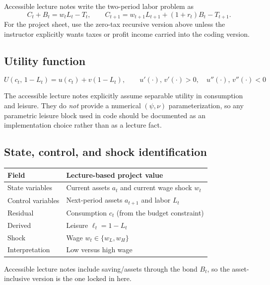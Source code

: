 \documentclass[11pt]{article}
\begin{document}
\begin{notebox}
Accessible lecture notes write the two-period labor problem as
\[
C_t + B_t = w_t L_t - T_t, \qquad C_{t+1} = w_{t+1}L_{t+1} + (1+r_t)B_t - T_{t+1}.
\]
For the project sheet, use the zero-tax recursive version above unless the instructor explicitly wants taxes or profit income carried into the coding version.
\end{notebox}

\subsection{Utility function}
\[
U(c_t,\,1-L_t) = u(c_t) + v(1-L_t),
\qquad
u'(\cdot),\,v'(\cdot) > 0,\quad
u''(\cdot),\,v''(\cdot) < 0
\]

\begin{notebox}
The accessible lecture notes explicitly assume separable utility in consumption and leisure. They do \emph{not} provide a numerical $(\psi,\nu)$ parameterization, so any parametric leisure block used in code should be documented as an implementation choice rather than as a lecture fact.
\end{notebox}

\subsection{State, control, and shock identification}

\begin{tabularx}{\linewidth}{@{}lX@{}}
\toprule
\textbf{Field} & \textbf{Lecture-based project value} \\
\midrule
State variables & Current assets $a_t$ and current wage shock $w_t$ \\
Control variables & Next-period assets $a_{t+1}$ and labor $L_t$ \\
Residual & Consumption $c_t$ (from the budget constraint) \\
Derived & Leisure $\ell_t = 1 - L_t$ \\
Shock & Wage $w_t \in \{w_L, w_H\}$ \\
Interpretation & Low versus high wage \\
\bottomrule
\end{tabularx}

\begin{notebox}
Accessible lecture notes include saving/assets through the bond $B_t$, so the asset-inclusive version is the one locked in here.
\end{notebox}
\end{document}
